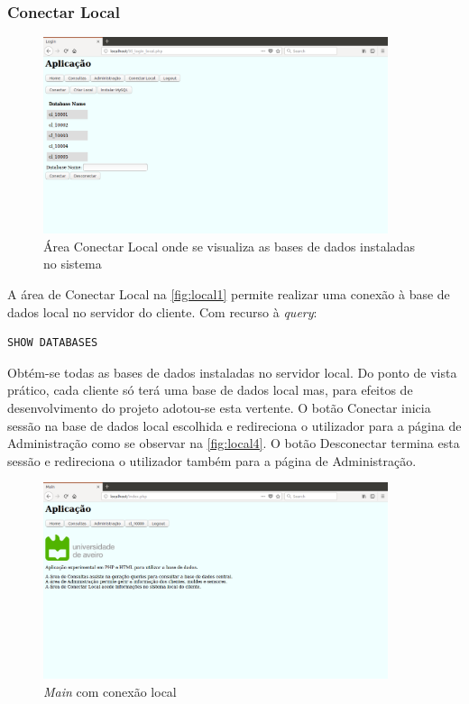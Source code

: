 \documentclass[11pt,twoside,a4paper]{report}
\begin{document}
\subsubsection{Conectar Local}
\label{subchap:local}
	\begin{figure}[H]
		\centering
			\includegraphics[width=0.9\textwidth]{local01} %
			\caption{Área Conectar Local onde se visualiza as bases de dados instaladas no sistema}
			\label{fig:local1}
	\end{figure}
A área de Conectar Local na \autoref{fig:local1} permite realizar uma conexão à base de dados local no servidor do cliente. Com recurso à \textit{query}:
\begin{lstlisting}[language = SQL]
	SHOW DATABASES
\end{lstlisting}
Obtém-se todas as bases de dados instaladas no servidor local. Do ponto de vista prático, cada cliente só terá uma base de dados local mas, para efeitos de desenvolvimento do projeto adotou-se esta vertente.
O botão Conectar inicia sessão na base de dados local escolhida e redireciona o utilizador para a página de Administração como se observar na \autoref{fig:local4}. O botão Desconectar termina esta sessão e redireciona o utilizador também para a página de Administração.
\newpage
\begin{figure}[H]
	\begin{center}
		\includegraphics[width=0.9\textwidth]{main03} %
		\caption{\textit{Main} com conexão local}
		\label{fig:local4}
	\end{center}
\end{figure}
\end{document}
